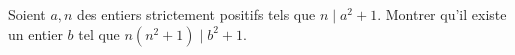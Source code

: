 Soient $a, n$ des entiers strictement positifs tels que $n\mid a^2+1$. Montrer qu'il existe un entier $b$ tel que $n(n^2 + 1) \mid b^2 + 1$.